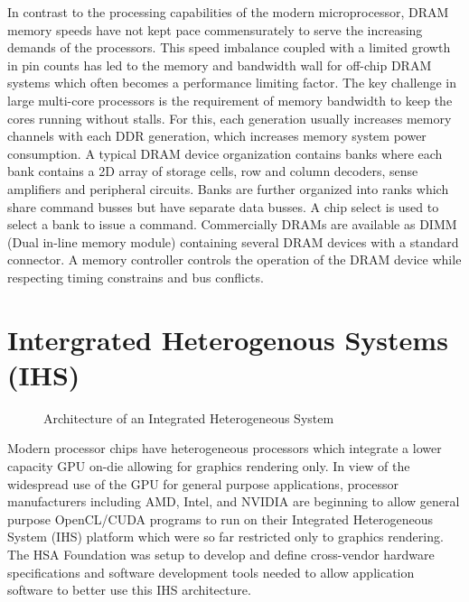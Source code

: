 \par In contrast to the processing capabilities of the modern microprocessor, DRAM memory speeds have not kept pace commensurately to serve the increasing demands of the processors. This speed imbalance coupled with a limited growth in pin counts has led to the memory and bandwidth wall \cite{memory-wall,bandwidth-wall} for off-chip DRAM systems which often becomes a performance limiting factor. The key challenge in large multi-core processors is the requirement of memory bandwidth to keep the cores running without stalls. For this, each generation usually increases memory channels with each DDR generation, which increases memory system power consumption.
A typical DRAM device organization contains banks where each bank contains a 2D array of storage cells, row and column decoders, sense amplifiers and peripheral circuits. Banks are further organized into ranks which share command busses but have separate data busses. A chip select is used to select a bank to issue a command. Commercially DRAMs are available as DIMM (Dual in-line memory module) containing several DRAM devices with a standard connector. A memory controller controls the operation of the DRAM device while respecting timing constrains and bus conflicts.



\section{Intergrated Heterogenous Systems (IHS)}
\begin{figure}[!htb]
	\centering
	\def\svgwidth{0.7\columnwidth}
	
	\caption{Architecture of an Integrated Heterogeneous System}
	\label{fig:hsa-arch}
\end{figure}

\par Modern processor chips have heterogeneous processors which integrate a lower capacity GPU on-die allowing for graphics rendering only. In view of the widespread use of the GPU for general purpose applications, processor manufacturers including AMD\cite{amd-apu}, Intel\cite{inteliris}, and NVIDIA\cite{denver} are beginning to allow general purpose OpenCL\cite{opencl}/CUDA\cite{cuda} programs to run on their Integrated Heterogeneous System (IHS) platform which were so far restricted only to graphics rendering. The HSA Foundation \cite{hsafoundation} was setup to develop and define cross-vendor hardware specifications and software development tools needed to allow application software to better use this IHS architecture. 

